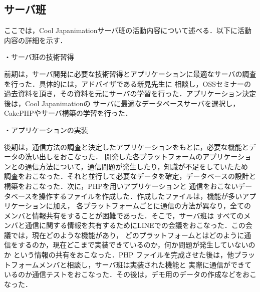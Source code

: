 \subsection{サーバ班}
\par
ここでは，Cool Japanimationサーバ班の活動内容について述べる．以下に活動内容の詳細を示す．
\par
・サーバ班の技術習得
\par
前期は，サーバ開発に必要な技術習得とアプリケーションに最適なサーバの調査を行った．具体的には，アドバイザである新見先生に
相談し，OSSセミナーの過去資料を頂き，その資料を元にサーバの学習を行った．アプリケーション決定後は，Cool Japanimationの
サーバに最適なデータベースサーバを選択し，CakePHPやサーバ構築の学習を行った．
\par
・アプリケーションの実装
\par
後期は，通信方法の調査と決定したアプリケーションをもとに，必要な機能とデータの洗い出しをおこなった．
開発した各プラットフォームのアプリケーションとの通信方法について，通信問題が発生したり，知識が不足をしていたため
調査をおこなった．それと並行して必要なデータを確定，データベースの設計と構築をおこなった．次に，PHPを用いアプリケーションと
通信をおこないデータベースを操作するファイルを作成した．作成したファイルは，機能が多いアプリケーションに加え，
各プラットフォームごとに通信の方法が異なり，全てのメンバと情報共有をすることが困難であった．そこで，サーバ班は
すべてのメンバと通信に関する情報を共有するためにLINEでの会議をおこなった．この会議では，現在どのような機能があり，
どのプラットフォームとはどのように通信をするのか，現在どこまで実装できているのか，何か問題が発生していないのか
という情報の共有をおこなった．PHP ファイルを完成させた後は，他プラットフォームメンバと相談し，サーバ班は実装された機能と
実際に通信ができているのか通信テストをおこなった．その後は，デモ用のデータの作成などをおこなった．



